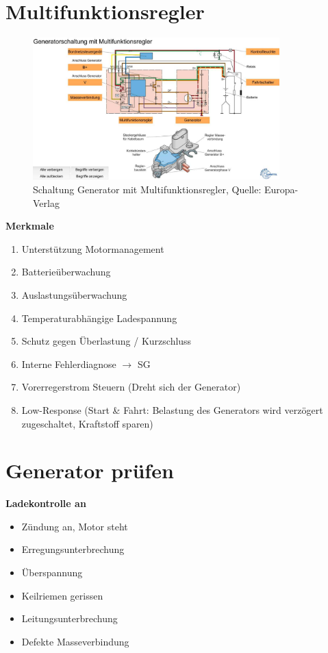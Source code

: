 \section{Multifunktionsregler}\label{multifunktionsregler}

\begin{figure}[!ht]%
\centering
\includegraphics[width=0.85\textwidth]{images/Generator/Generator-1.pdf}
\caption{Schaltung Generator mit Multifunktionsregler, Quelle:
Europa-Verlag}
\end{figure}

\textbf{Merkmale}

\begin{enumerate}
\item
  Unterstützung Motormanagement
\item
  Batterieüberwachung
\item
  Auslastungsüberwachung
\item
  Temperaturabhängige Ladespannung
\item
  Schutz gegen Überlastung / Kurzschluss
\item
  Interne Fehlerdiagnose $\to$ SG
\item
  Vorerregerstrom Steuern (Dreht sich der Generator)
\item
  Low-Response (Start \& Fahrt: Belastung des Generators wird verzögert
  zugeschaltet, Kraftstoff sparen)
\end{enumerate}

\newpage

\section{Generator prüfen}\label{generator-pruefen}

\textbf{Ladekontrolle an}

\begin{itemize}
\item
  Zündung an, Motor steht
\item
  Erregungsunterbrechung
\item
  Überspannung
\item
  Keilriemen gerissen
\item
  Leitungsunterbrechung
\item
  Defekte Masseverbindung
\end{itemize}

